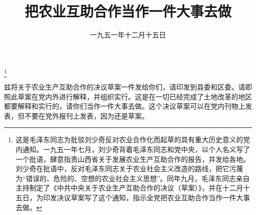 
\title{把农业互助合作当作一件大事去做}
\date{一九五一年十二月十五日}
\thanks{这是毛泽东同志为批驳刘少奇反对农业合作化而起草的具有重大历史意义的党内通知。一九五一年七月，刘少奇背着毛泽东同志和党中央，以个人名义写了一个批语，肆意指责山西省关于发展农业生产互助合作的报告，并发给各地。刘少奇在批语中，反对毛泽东同志关于农业社会主义改造的路线，把它污蔑为“错误的、危险的、空想的农业社会主义思想”。同年九月，毛泽东同志亲自主持制定了《中共中央关于农业生产互助合作的决议（草案）》，并在十二月十五日，为印发决议草案写了这个通知，指示全党把农业互助合作当作一件大事去做。}
\maketitle


兹将关于农业生产互助合作的决议草案一件发给你们，请印发到县委和区委。请即照此草案在党内外进行解释，并组织实行。这是在一切已经完成了土地改革的地区都要解释和实行的，请你们当作一件大事去做。这个决议草案可以在党内刊物上发表，但不要在党外报刊上发表，因为还是草案。
